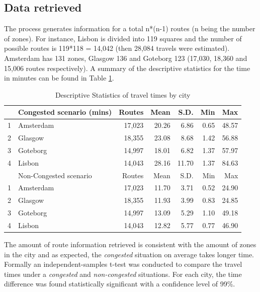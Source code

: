 \documentclass[a4paper]{jpconf}
\begin{document}
\subsection{Data retrieved}
The process generates information for a total n*(n-1) routes (n being the number of zones). For instance, Lisbon is divided into 119 squares and the number of possible routes is 119*118 = 14,042 (then 28,084 travels were estimated). Amsterdam has 131 zones, Glasgow 136 and Goteborg 123 (17,030, 18,360 and 15,006 routes respectively). A summary of the descriptive statistics for the time in minutes can be found in Table \ref{tab:Results_routes}.

\begin{table}[ht]		
	\centering
	\begin{tabular}{rlrrrrr}
		\hline
		& Congested scenario (mins) & Routes & Mean & S.D. & Min & Max 	   \\ 
		\hline
		1 & Amsterdam 	& 17,023 & 20.26 & 6.86 	& 0.65 & 48.57 		   \\ 
		2 & Glasgow 	& 18,355 & 23.08 & 8.68 	& 1.42 & 56.88 		   \\ 
		3 & Goteborg 	& 14,997 & 18.01 & 6.82 	& 1.37 & 57.97 	       \\ 
		4 & Lisbon 		& 14,043 & 28.16 & 11.70 	& 1.37 & 84.63 	       \\ 
		
		\hline
		& Non-Congested scenario & Routes & Mean & S.D. & Min & Max    \\ 
		\hline
		1 & Amsterdam	& 17,023 & 11.70 & 3.71 & 0.52 & 24.90 	       \\ 
		2 & Glasgow 	& 18,355 & 11.93 & 3.99 & 0.83 & 24.85 	       \\ 
		3 & Goteborg 	& 14,997 & 13.09 & 5.29 & 1.10 & 49.18 	       \\ 
		4 & Lisbon 		& 14,043 & 12.82 & 5.77 & 0.77 & 46.90         \\ 
		\hline
	\end{tabular}
	\caption {Descriptive Statistics of travel times by city}
	\label{tab:Results_routes}
\end{table}

\indent The amount of route information retrieved is consistent with the amount of zones in the city and as expected, the \textit{congested} situation on average takes longer time. Formally an 
independent-samples t-test was conducted to compare the travel times under a \textit{congested} and \textit{non-congested} situations. For each city, the time difference was found statistically significant with a confidence level of 99\%.
\end{document}
